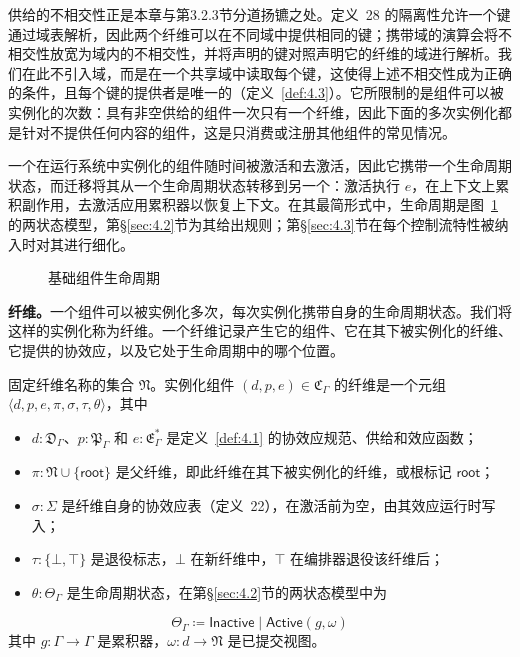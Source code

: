 供给的不相交性正是本章与第3.2.3节分道扬镳之处。定义~28 的隔离性允许一个键通过域表解析，因此两个纤维可以在不同域中提供相同的键；携带域的演算会将不相交性放宽为域内的不相交性，并将声明的键对照声明它的纤维的域进行解析。我们在此不引入域，而是在一个共享域中读取每个键，这使得上述不相交性成为正确的条件，且每个键的提供者是唯一的（定义~\ref{def:4.3}）。它所限制的是组件可以被实例化的次数：具有非空供给的组件一次只有一个纤维，因此下面的多次实例化都是针对不提供任何内容的组件，这是只消费或注册其他组件的常见情况。

一个在运行系统中实例化的组件随时间被激活和去激活，因此它携带一个生命周期状态，而迁移将其从一个生命周期状态转移到另一个：激活执行 $e$，在上下文上累积副作用，去激活应用累积器以恢复上下文。在其最简形式中，生命周期是图~\ref{fig:4.1} 的两状态模型，第\S\ref{sec:4.2}节为其给出规则；第\S\ref{sec:4.3}节在每个控制流特性被纳入时对其进行细化。

\begin{figure}[htbp]
\centering
{}
\caption{基础组件生命周期}\label{fig:4.1}
\end{figure}

\textbf{纤维。}一个组件可以被实例化多次，每次实例化携带自身的生命周期状态。我们将这样的实例化称为纤维。一个纤维记录产生它的组件、它在其下被实例化的纤维、它提供的协效应，以及它处于生命周期中的哪个位置。

\begin{definition}\label{def:4.2}
固定纤维名称的集合 $\mathfrak{N}$。实例化组件 $(d, p, e) \in \mathfrak{C}_\Gamma$ 的纤维是一个元组 $\langle d, p, e, \pi, \sigma, \tau, \theta\rangle$，其中
\begin{itemize}
\item $d: \mathfrak{D}_\Gamma$、$p: \mathfrak{P}_\Gamma$ 和 $e: \mathfrak{E}^*_\Gamma$ 是定义~\ref{def:4.1} 的协效应规范、供给和效应函数；
\item $\pi: \mathfrak{N} \cup \{\mathsf{root}\}$ 是父纤维，即此纤维在其下被实例化的纤维，或根标记 $\mathsf{root}$；
\item $\sigma: \Sigma$ 是纤维自身的协效应表（定义~22），在激活前为空，由其效应运行时写入；
\item $\tau: \{\bot, \top\}$ 是退役标志，$\bot$ 在新纤维中，$\top$ 在编排器退役该纤维后；
\item $\theta: \Theta_\Gamma$ 是生命周期状态，在第\S\ref{sec:4.2}节的两状态模型中为
\end{itemize}
\begin{equation}\label{eq:4.2}
\Theta_\Gamma \coloneqq \mathsf{Inactive} \mid \mathsf{Active}(g, \omega)
\end{equation}
其中 $g: \Gamma \to \Gamma$ 是累积器，$\omega: d \to \mathfrak{N}$ 是已提交视图。
\end{definition}

